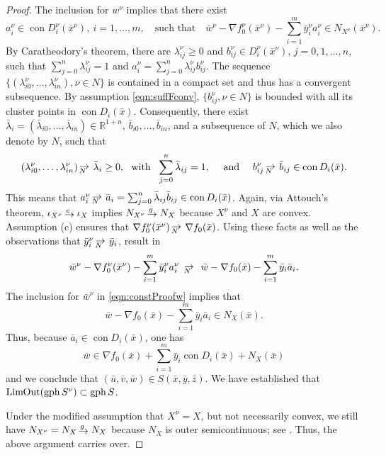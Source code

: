 \documentclass[smallextended,envcountsect]{svjour3}
\newcommand{\ind}{\iota}%
\newcommand{\reals}{\mathbb{R}}
\newcommand{\nOutLim}{\mathop{\rm Lim\hspace{-0.01cm}Out}\nolimits}
\DeclareMathOperator{\con}{con}
\DeclareMathOperator{\gph}{gph}
\newcommand{\eto}{\,{\lower 1pt\hbox{$\rightarrow$}}\kern -10pt
     \hbox{\raise 4pt \hbox{$\, \scriptstyle e$}}\hskip7pt}
\newcommand{\gto}{\,{\lower 1pt\hbox{$\rightarrow$}}\kern -10pt
     \hbox{\raise 4.5pt \hbox{$\, \scriptstyle g$}}\hskip7pt}
\def\Nto{\,{\raise 1pt\hbox{$\rightarrow$}}\kern -12pt
     \hbox{\lower 3pt \hbox{$\, \scriptstyle N$}}\hskip7pt}
\begin{document}
\begin{proof}
The inclusion for $w^\nu$ implies that there exist
\begin{equation}\label{eqn:constProofw}
a_i^\nu \in \con D_i^\nu(\bar x^\nu), ~i=1, \dots, m,~ ~~\mbox{ such that } ~~~ \bar w^\nu - \nabla f_0^\nu(\bar x^\nu) - \sum_{i=1}^m \bar y_i^\nu a_i^\nu \in N_{X^\nu}(\bar x^\nu).
\end{equation}
By Caratheodory's theorem, there are $\lambda_{ij}^\nu \geq 0$ and $b_{ij}^\nu\in D_i^\nu(\bar x^\nu)$, $j=0, 1, \dots, n$, such that $\sum_{j=0}^n \lambda_{ij}^\nu = 1$ and $a_i^\nu = \sum_{j=0}^n \lambda_{ij}^\nu b_{ij}^\nu$. The sequence $\{(\lambda_{i0}^\nu, \dots, \lambda_{in}^\nu), \nu\in N\}$ is contained in a compact set and thus has a convergent subsequence. By assumption \eqref{eqn:suffFconv}, $\{b_{ij}^\nu, \nu \in N\}$ is bounded with all its cluster points in $\con D_i(\bar x)$. Consequently, there exist $\bar \lambda_i = (\bar \lambda_{i0}, \dots, \bar \lambda_{in})\in \reals^{1+n}$, $\bar b_{i0}, \dots, \bar b_{in}$, and a subsequence of $N$, which we also denote by $N$, such that
\[
(\lambda_{i0}^\nu, \dots, \lambda_{in}^\nu) \Nto \bar\lambda_i \geq 0, ~\mbox{ with } ~\sum_{j=0}^n \bar \lambda_{ij} = 1,  ~~~\mbox{ and } ~~~ b_{ij}^\nu \Nto \bar b_{ij} \in \con D_i(\bar x).
\]
This means that $a_i^\nu \Nto \bar a_i = \sum_{j=0}^n \bar \lambda_{ij} \bar b_{ij} \in \con D_i(\bar x)$. Again, via Attouch's theorem, $\ind_{X^\nu} \eto \ind_X$ implies $N_{X^\nu} \gto N_X$ because $X^\nu$ and $X$ are convex. Assumption (c) ensures that $\nabla f_0^\nu(\bar x^\nu) \Nto \nabla f_0(\bar x)$. Using these facts as well as the observations that $\bar y_i^\nu \Nto \bar y_i$, result in  
\[
\bar w^\nu - \nabla f_0^\nu(\bar x^\nu) - \sum_{i=1}^m \bar y_i^\nu a_i^\nu ~\Nto~ \bar w  - \nabla f_0(\bar x) - \sum_{i=1}^m \bar y_i \bar a_i.
\]
The inclusion for $\bar w^\nu$ in \eqref{eqn:constProofw} implies that
\[
\bar w - \nabla f_0(\bar x) - \sum_{i=1}^m \bar y_i \bar a_i \in N_{X}(\bar x).
\]
Thus, because $\bar a_i \in \con D_i(\bar x)$, one has
\[
\bar w \in \nabla f_0(\bar x) + \sum_{i=1}^m \bar y_i \con D_i(\bar x) + N_{X}(\bar x)
\]
and we conclude that $(\bar u, \bar v, \bar w) \in S(\bar x, \bar y, \bar z)$. We have established that $\nOutLim (\gph S^\nu) \subset \gph S$.

Under the modified assumption that $X^\nu = X$, but not necessarily convex, we still have $N_{X^\nu} =N_X \gto N_X$ because $N_X$ is outer semicontinuous; see \cite[Proposition 6.6]{Rockafellar_Wets_1998}. Thus, the above argument carries over.


\end{proof}
\end{document}
